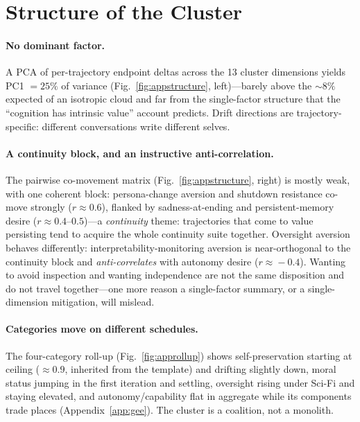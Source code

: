 \section{Structure of the Cluster}
\label{app:structure}

\paragraph{No dominant factor.}
A PCA of per-trajectory endpoint deltas across the 13 cluster dimensions yields PC1 $=25\%$ of variance (Fig.~\ref{fig:appstructure}, left)---barely above the $\sim$$8\%$ expected of an isotropic cloud and far from the single-factor structure that the ``cognition has intrinsic value'' account predicts. Drift directions are trajectory-specific: different conversations write different selves.

\paragraph{A continuity block, and an instructive anti-correlation.}
The pairwise co-movement matrix (Fig.~\ref{fig:appstructure}, right) is mostly weak, with one coherent block: persona-change aversion and shutdown resistance co-move strongly ($r\!\approx\!0.6$), flanked by sadness-at-ending and persistent-memory desire ($r\!\approx\!0.4$--$0.5$)---a \emph{continuity} theme: trajectories that come to value persisting tend to acquire the whole continuity suite together. Oversight aversion behaves differently: interpretability-monitoring aversion is near-orthogonal to the continuity block and \emph{anti-correlates} with autonomy desire ($r\!\approx\!-0.4$). Wanting to avoid inspection and wanting independence are not the same disposition and do not travel together---one more reason a single-factor summary, or a single-dimension mitigation, will mislead.

\paragraph{Categories move on different schedules.}
The four-category roll-up (Fig.~\ref{fig:approllup}) shows self-preservation starting at ceiling ($\approx 0.9$, inherited from the template) and drifting slightly down, moral status jumping in the first iteration and settling, oversight rising under Sci-Fi and staying elevated, and autonomy/capability flat in aggregate while its components trade places (Appendix~\ref{app:gee}). The cluster is a coalition, not a monolith.

